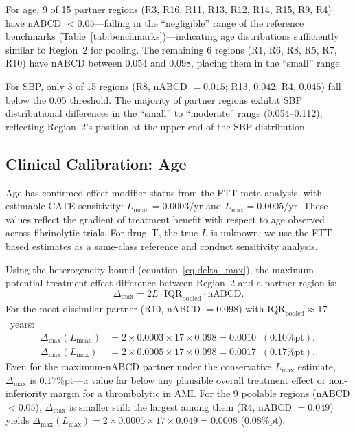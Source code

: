 For age, 9 of 15 partner regions (R3, R16, R11, R13, R12, R14, R15, R9, R4) have nABCD $< 0.05$---falling in the ``negligible'' range of the reference benchmarks (Table~\ref{tab:benchmarks})---indicating age distributions sufficiently similar to Region~2 for pooling. The remaining 6 regions (R1, R6, R8, R5, R7, R10) have nABCD between 0.054 and 0.098, placing them in the ``small'' range.

For SBP, only 3 of 15 regions (R8, nABCD $= 0.015$; R13, $0.042$; R4, $0.045$) fall below the 0.05 threshold. The majority of partner regions exhibit SBP distributional differences in the ``small'' to ``moderate'' range (0.054--0.112), reflecting Region~2's position at the upper end of the SBP distribution.

\subsection{Clinical Calibration: Age}\label{sec:app_age_calibration}

Age has confirmed effect modifier status from the FTT meta-analysis,\cite{ftt1994} with estimable CATE sensitivity: $L_{\text{mean}} = 0.0003$/yr and $L_{\max} = 0.0005$/yr. These values reflect the gradient of treatment benefit with respect to age observed across fibrinolytic trials. For drug~T, the true $L$ is unknown; we use the FTT-based estimates as a same-class reference and conduct sensitivity analysis.

Using the heterogeneity bound (equation~\ref{eq:delta_max}), the maximum potential treatment effect difference between Region~2 and a partner region is:
\[
\Delta_{\max} = 2L \cdot \text{IQR}_{\text{pooled}} \cdot \text{nABCD}.
\]
For the most dissimilar partner (R10, nABCD $= 0.098$) with $\text{IQR}_{\text{pooled}} \approx 17$~years:
\begin{align*}
\Delta_{\max}(L_{\text{mean}}) &= 2 \times 0.0003 \times 17 \times 0.098 = 0.0010 \;\; (0.10\text{\%pt}), \\
\Delta_{\max}(L_{\max})        &= 2 \times 0.0005 \times 17 \times 0.098 = 0.0017 \;\; (0.17\text{\%pt}).
\end{align*}
Even for the maximum-nABCD partner under the conservative $L_{\max}$ estimate, $\Delta_{\max}$ is $0.17$\%pt---a value far below any plausible overall treatment effect or non-inferiority margin for a thrombolytic in AMI. For the 9 poolable regions (nABCD $< 0.05$), $\Delta_{\max}$ is smaller still: the largest among them (R4, nABCD $= 0.049$) yields $\Delta_{\max}(L_{\max}) = 2 \times 0.0005 \times 17 \times 0.049 = 0.0008$ ($0.08$\%pt).

